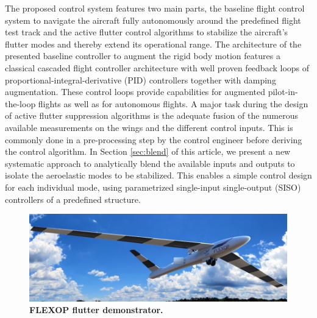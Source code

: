 \documentclass[aerospace,article,submit,moreauthors,pdftex,10pt,a4paper]{Definitions/mdpi}
\begin{document}
The proposed control system features two main parts, the baseline flight control system to navigate the aircraft fully autonomously around the predefined flight test track and the active flutter control algorithms to stabilize the aircraft's flutter modes and thereby extend its operational range.
The architecture of the presented baseline controller to augment the rigid body motion features a classical cascaded flight controller architecture \cite{brock11,Stevens15,Theis18cep} with well proven feedback loops of proportional-integral-derivative (PID) controllers together with damping augmentation. These control loops provide capabilities for augmented pilot-in-the-loop flights  as well as for autonomous flights.  A major task during the design of active flutter suppression algorithms is the adequate fusion of the numerous available measurements on the wings and the different control inputs. This is commonly done in a  pre-processing step by the control engineer before deriving the control algorithm. 
In Section \ref{sec:blend} of this article,  we present a new systematic  approach to analytically blend the available inputs and outputs to isolate the aeroelastic modes to be stabilized. This enables a simple control design for each individual mode, using parametrized single-input single-output (SISO) controllers of a predefined structure.
\begin{figure}
	\centering
	\includegraphics[width=1\linewidth]{figs/ac.jpg}
	\caption{\textbf{FLEXOP flutter demonstrator.}}
	\label{fig:ac}
\end{figure}
\end{document}
